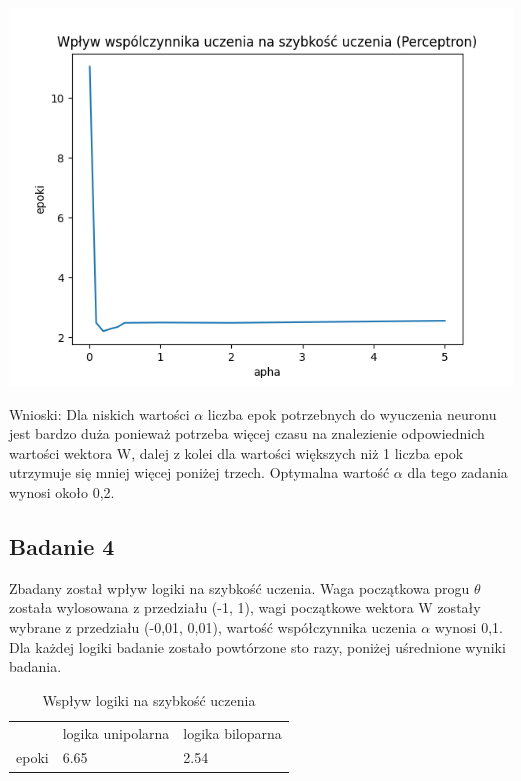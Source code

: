 \documentclass{article}
\begin{document}
\begin{center}
\includegraphics[scale=0.8]{per_exp3.png}
\end{center}

Wnioski: Dla niskich wartości $\alpha$ liczba epok potrzebnych do wyuczenia neuronu jest bardzo duża ponieważ potrzeba więcej czasu na znalezienie odpowiednich wartości wektora W, dalej z kolei dla wartości większych niż 1 liczba epok utrzymuje się mniej więcej poniżej trzech. Optymalna wartość $\alpha$ dla tego zadania wynosi około 0,2.\\
\newpage
\subsection{Badanie 4}

Zbadany został wpływ logiki na szybkość uczenia. Waga początkowa progu $\theta$ została wylosowana z przedziału (-1, 1), wagi początkowe wektora W zostały wybrane z przedziału (-0,01, 0,01), wartość współczynnika uczenia $\alpha$ wynosi 0,1. Dla każdej logiki badanie zostało powtórzone sto razy, poniżej uśrednione wyniki badania.\\


\begin{table}[h]
  \centering
  \caption{Wspływ logiki na szybkość uczenia}
  \begin{tabular}{lll}
    \toprule
    & logika unipolarna & logika biloparna \\
    epoki & 6.65 & 2.54 \\
    \bottomrule
  \end{tabular}
\end{table}
\end{document}
